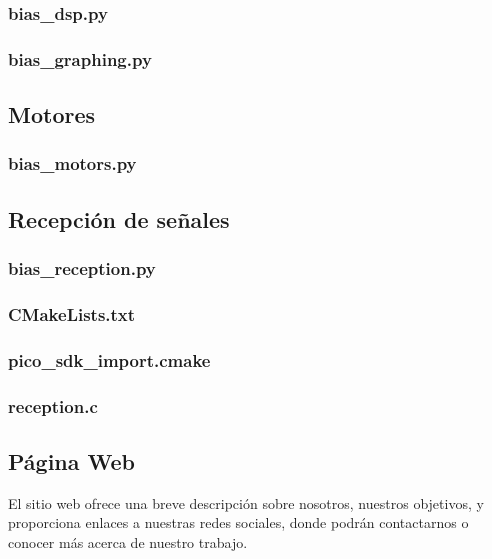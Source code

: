\documentclass{article}
\begin{document}
\subsubsection{bias\_dsp.py}

\subsubsection{bias\_graphing.py} 


\subsection{Motores}

\subsubsection{bias\_motors.py}


\subsection{Recepción de señales}

\subsubsection{bias\_reception.py}



\subsubsection{CMakeLists.txt}

\subsubsection{pico\_sdk\_import.cmake}

\subsubsection{reception.c}

\subsection{Página Web}
El sitio web ofrece una breve descripción sobre nosotros, nuestros objetivos, y proporciona enlaces a nuestras redes sociales, donde podrán contactarnos o conocer más acerca de nuestro trabajo.
\end{document}
